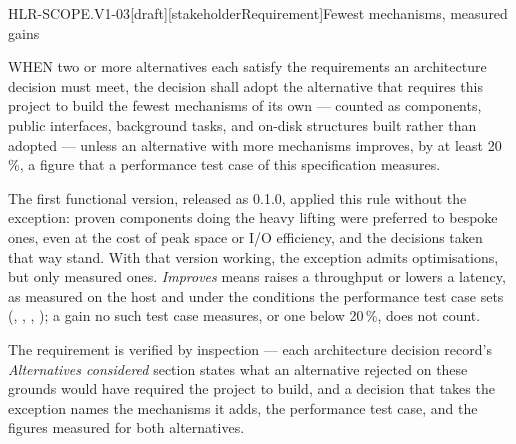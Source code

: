 \begin{requirement}{HLR-SCOPE.V1-03}[draft][stakeholderRequirement]{Fewest mechanisms, measured gains}


  WHEN two or more alternatives each satisfy the requirements an architecture
  decision must meet, the decision shall adopt the alternative that requires
  this project to build the fewest mechanisms of its own --- counted as
  components, public interfaces, background tasks, and on-disk structures
  built rather than adopted --- unless an alternative with more mechanisms
  improves, by at least 20\,\%, a figure that a performance test case of this
  specification measures.

  The first functional version, released as 0.1.0, applied this rule without
  the exception: proven components doing the heavy lifting were preferred to
  bespoke ones, even at the cost of peak space or I/O efficiency, and the
  decisions taken that way stand. With that version working, the exception
  admits optimisations, but only measured ones. \emph{Improves} means raises
  a throughput or lowers a latency, as measured on the host and under the
  conditions the performance test case sets
  (, ,
  , );
  a gain no such test case measures, or one below 20\,\%, does not count.

  The requirement is verified by inspection --- each architecture decision
  record's \emph{Alternatives considered} section states what an alternative
  rejected on these grounds would have required the project to build, and a
  decision that takes the exception names the mechanisms it adds, the
  performance test case, and the figures measured for both alternatives.


\end{requirement}

